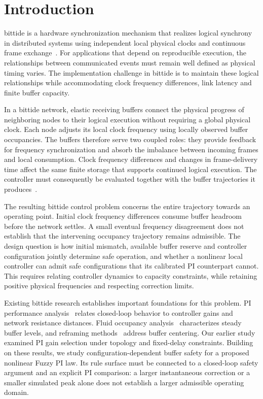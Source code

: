 \section{Introduction}
\label{sec:introduction}

bittide is a hardware synchronization mechanism that realizes logical synchrony in distributed systems using independent local physical clocks and continuous frame exchange~\cite{lall2024logicalSynchrony}. For applications that depend on reproducible execution, the relationships between communicated events must remain well defined as physical timing varies. The implementation challenge in bittide is to maintain these logical relationships while accommodating clock frequency differences, link latency and finite buffer capacity.

In a bittide network, elastic receiving buffers connect the physical progress of neighboring nodes to their logical execution without requiring a global physical clock. Each node adjusts its local clock frequency using locally observed buffer occupancies. The buffers therefore serve two coupled roles: they provide feedback for frequency synchronization and absorb the imbalance between incoming frames and local consumption. Clock frequency differences and changes in frame-delivery time affect the same finite storage that supports continued logical execution. The controller must consequently be evaluated together with the buffer trajectories it produces~\cite{lall2024logicalSynchrony}.

The resulting bittide control problem concerns the entire trajectory towards an operating point. Initial clock frequency differences consume buffer headroom before the network settles. A small eventual frequency disagreement does not establish that the intervening occupancy trajectory remains admissible. The design question is how initial mismatch, available buffer reserve and controller configuration jointly determine safe operation, and whether a nonlinear local controller can admit safe configurations that its calibrated PI counterpart cannot. This requires relating controller dynamics to capacity constraints, while retaining positive physical frequencies and respecting correction limits.

Existing bittide research establishes important foundations for this problem. PI performance analysis~\cite{lall2022resistance} relates closed-loop behavior to controller gains and network resistance distances. Fluid occupancy analysis~\cite{lall2024bufferOccupancy} characterizes steady buffer levels, and reframing methods~\cite{lall2023bufferCentering} address buffer centering. Our earlier study examined PI gain selection under topology and fixed-delay constraints. Building on these results, we study configuration-dependent buffer safety for a proposed nonlinear Fuzzy PI law. Its rule surface must be connected to a closed-loop safety argument and an explicit PI comparison: a larger instantaneous correction or a smaller simulated peak alone does not establish a larger admissible operating domain.

